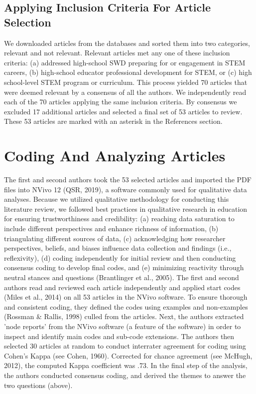 \documentclass[11.5pt]{sig-alternate}
\begin{document}
\begin{large}
\subsection*{Applying Inclusion Criteria For Article Selection}
We downloaded articles from the databases and sorted them into two categories, relevant and not relevant. Relevant articles met any one of these inclusion criteria: (a) addressed high-school SWD preparing for or engagement in STEM careers, (b) high-school educator professional development for STEM, or (c) high school-level STEM program or curriculum. This process yielded 70 articles that were deemed relevant by a consensus of all the authors. We independently read each of the 70 articles applying the same inclusion criteria. By consensus we excluded 17 additional articles and selected a final set of 53 articles to review. These 53 articles are marked with an asterisk in the References section.

\section*{Coding And Analyzing Articles}
The first and second authors took the 53 selected articles and imported the PDF files into NVivo 12 (QSR, 2019), a software commonly used for qualitative data analyses. Because we utilized qualitative methodology for conducting this literature review, we followed best practices in qualitative research in education for ensuring trustworthiness and credibility: (a) reaching data saturation to include different perspectives and enhance richness of information, (b) triangulating different sources of data, (c) acknowledging how researcher perspectives, beliefs, and biases influence data collection and findings (i.e., reflexivity), (d) coding independently for initial review and then conducting consensus coding to develop final codes, and (e) minimizing reactivity through neutral stances and questions (Brantlinger et al., 2005).  
The first and second authors read and reviewed each article independently and applied start codes (Miles et al., 2014) on all 53 articles in the NVivo software. To ensure thorough and consistent coding, they defined the codes using examples and non-examples (Rossman \& Rallis, 1998) culled from the articles. Next, the authors extracted 'node reports’ from the NVivo software (a feature of the software) in order to inspect and identify main codes and sub-code extensions. The authors then selected 30 articles at random to conduct interrater agreement for coding using Cohen’s Kappa (see Cohen, 1960). Corrected for chance agreement (see McHugh, 2012), the computed Kappa coefficient was .73. In the final step of the analysis, the authors conducted consensus coding, and derived the themes to answer the two questions (above).  


\end{large}
\end{document}
